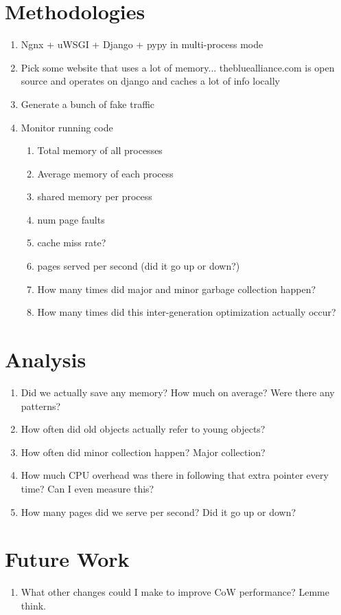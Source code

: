\documentclass{article}
\begin{document}
\section{Methodologies}
\begin{enumerate}
  \item Ngnx + uWSGI + Django + pypy in multi-process mode
  \item Pick some website that uses a lot of memory... thebluealliance.com is open source and operates on django and caches a lot of info locally
  \item Generate a bunch of fake traffic 
  \item Monitor running code
  \begin{enumerate}
  	\item Total memory of all processes
    \item Average memory of each process
    \item shared memory per process
    \item num page faults
    \item cache miss rate?
    \item pages served per second (did it go up or down?)
    \item How many times did major and minor garbage collection happen?
    \item How many times did this inter-generation optimization actually occur?
  \end{enumerate}
\end{enumerate}

\section{Analysis}
\begin{enumerate}
  \item Did we actually save any memory?  How much on average?  Were there any patterns?   
  \item How often did old objects actually refer to young objects?  
  \item How often did minor collection happen?  Major collection?
  \item How much CPU overhead was there in following that extra pointer every time?  Can I even measure this?
  \item How many pages did we serve per second?  Did it go up or down?
\end{enumerate}

\section{Future Work}
\begin{enumerate}
	\item What other changes could I make to improve CoW performance?  Lemme think.
\end{enumerate}
\end{document}
